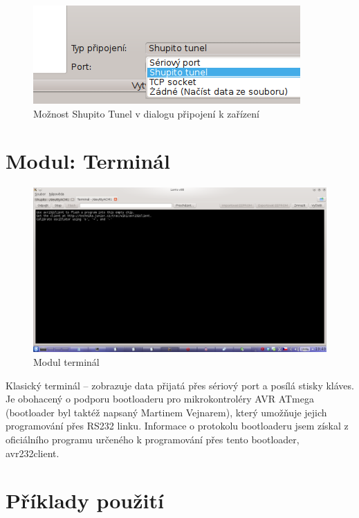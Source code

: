 \documentclass[12pt, a4paper, oneside]{article}
\begin{document}
\begin{figure}[H]
\begin{center}
\includegraphics{img/con_tunel.png}
\caption{Možnost Shupito Tunel v dialogu připojení k zařízení}
\end{center}
\end{figure}

\newpage
\section{Modul: Terminál}
\begin{figure}[h]
\begin{center}
\includegraphics[width=\textwidth]{img/terminal.png}
\caption{Modul terminál}
\label{Terminal}
\end{center}
\end{figure}

Klasický terminál -- zobrazuje data přijatá přes sériový port a posílá stisky kláves. Je obohacený o podporu bootloaderu pro mikrokontroléry AVR ATmega (bootloader byl taktéž napsaný Martinem Vejnarem), který umožňuje jejich programování přes RS232 linku. Informace o protokolu bootloaderu jsem získal z oficiálního programu určeného k programování přes tento bootloader, avr232client.


\newpage
\section{Příklady použití}
\end{document}

